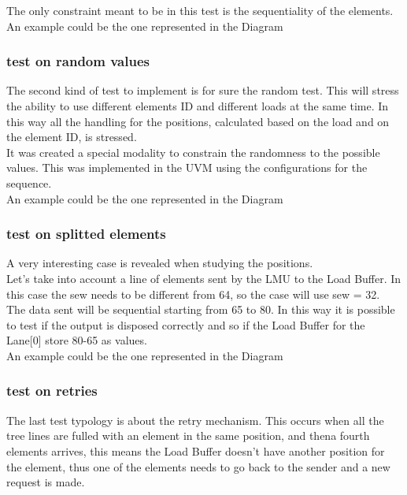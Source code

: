 The only constraint meant to be in this test is the sequentiality of the elements.\\
An example could be the one represented in the Diagram %

\subsubsection{test on random values}
The second kind of test to implement is for sure the random test. This will stress the ability to use different elements ID and different loads at the same time. In this way all the handling for the positions, calculated based on the load and on the element ID, is stressed.\\

It was created a special modality to constrain the randomness to the possible values. This was implemented in the UVM using the configurations for the sequence.\\

An example could be the one represented in the Diagram %
%

\subsubsection{test on splitted elements} 
A very interesting case is revealed when studying the positions.\\
Let's take into account a line of elements sent by the LMU to the Load Buffer. In this case the sew needs to be different from 64, so the case will use sew = 32.\\

The data sent will be sequential starting from 65 to 80. In this way it is possible to test if the output is disposed correctly and so if the Load Buffer for the Lane[0] store 80-65 as values.\\

An example could be the one represented in the Diagram %

\subsubsection{test on retries}
The last test typology is about the retry mechanism. This occurs when all the tree lines are fulled with an element in the same position, and thena fourth elements arrives, this means the Load Buffer doesn't have another position for the element, thus one of the elements needs to go back to the sender and a new request is made.\\

